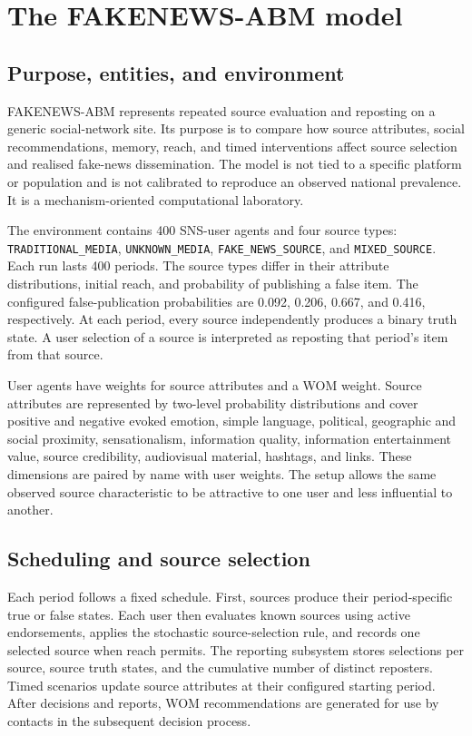 \section{The FAKENEWS-ABM model}
\label{sec:model}

\subsection{Purpose, entities, and environment}

FAKENEWS-ABM represents repeated source evaluation and reposting on a generic social-network site. Its purpose is to compare how source attributes, social recommendations, memory, reach, and timed interventions affect source selection and realised fake-news dissemination. The model is not tied to a specific platform or population and is not calibrated to reproduce an observed national prevalence. It is a mechanism-oriented computational laboratory.

The environment contains 400 SNS-user agents and four source types: \texttt{TRADITIONAL\_MEDIA}, \texttt{UNKNOWN\_MEDIA}, \texttt{FAKE\_NEWS\_SOURCE}, and \texttt{MIXED\_SOURCE}. Each run lasts 400 periods. The source types differ in their attribute distributions, initial reach, and probability of publishing a false item. The configured false-publication probabilities are 0.092, 0.206, 0.667, and 0.416, respectively. At each period, every source independently produces a binary truth state. A user selection of a source is interpreted as reposting that period's item from that source.

User agents have weights for source attributes and a WOM weight. Source attributes are represented by two-level probability distributions and cover positive and negative evoked emotion, simple language, political, geographic and social proximity, sensationalism, information quality, information entertainment value, source credibility, audiovisual material, hashtags, and links. These dimensions are paired by name with user weights. The setup allows the same observed source characteristic to be attractive to one user and less influential to another.



\subsection{Scheduling and source selection}

Each period follows a fixed schedule. First, sources produce their period-specific true or false states. Each user then evaluates known sources using active endorsements, applies the stochastic source-selection rule, and records one selected source when reach permits. The reporting subsystem stores selections per source, source truth states, and the cumulative number of distinct reposters. Timed scenarios update source attributes at their configured starting period. After decisions and reports, WOM recommendations are generated for use by contacts in the subsequent decision process.

